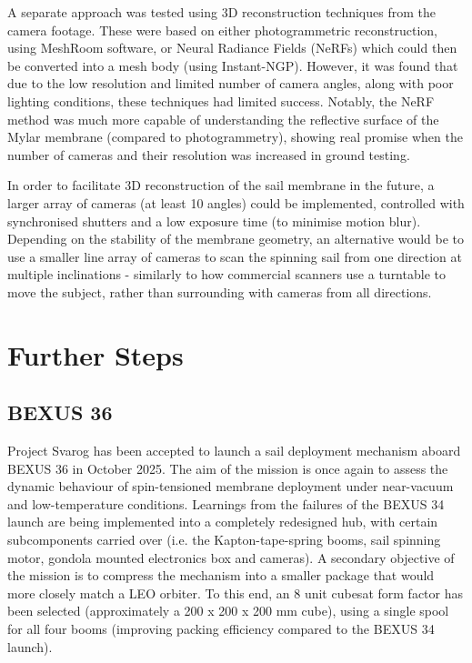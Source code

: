\documentclass[final,3p,times,twocolumn]{elsarticle}
\begin{document}
\vspace{5pt}
\par\noindent A separate approach was tested using 3D reconstruction techniques from the camera footage. These were based on either photogrammetric reconstruction, using MeshRoom \citep{alicevision2021} software, or Neural Radiance Fields (NeRFs) which could then be converted into a mesh body (using Instant-NGP). However, it was found that due to the low resolution and limited number of camera angles, along with poor lighting conditions, these techniques had limited success. Notably, the NeRF method was much more capable of understanding the reflective surface of the Mylar membrane (compared to photogrammetry), showing real promise when the number of cameras and their resolution was increased in ground testing. 

\vspace{5pt}
\par\noindent In order to facilitate 3D reconstruction of the sail membrane in the future, a larger array of cameras (at least 10 angles) could be implemented, controlled with synchronised shutters and a low exposure time (to minimise motion blur). Depending on the stability of the membrane geometry, an alternative would be to use a smaller line array of cameras to scan the spinning sail from one direction at multiple inclinations - similarly to how commercial scanners use a turntable to move the subject, rather than surrounding with cameras from all directions.

\vspace{7pt}
\section{Further Steps}
\subsection{BEXUS 36}
\noindent Project Svarog has been accepted to launch a sail deployment mechanism aboard BEXUS 36 in October 2025. The aim of the mission is once again to assess the dynamic behaviour of spin-tensioned membrane deployment under near-vacuum and low-temperature conditions. Learnings from the failures of the BEXUS 34 launch are being implemented into a completely redesigned hub, with certain subcomponents carried over (i.e. the Kapton-tape-spring booms, sail spinning motor, gondola mounted electronics box and cameras). A secondary objective of the mission is to compress the mechanism into a smaller package that would more closely match a LEO orbiter. To this end, an 8 unit cubesat form factor has been selected (approximately a 200 x 200 x 200 mm cube), using a single spool for all four booms (improving packing efficiency compared to the BEXUS 34 launch).
\end{document}
